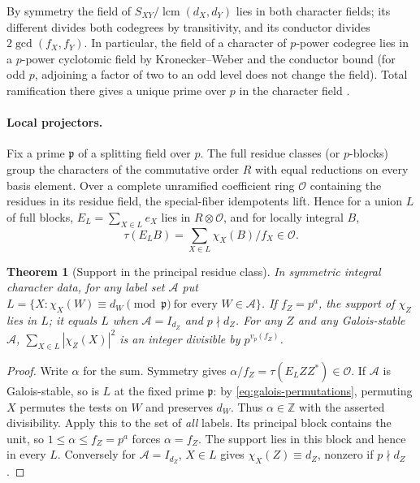 \documentclass[11pt,a4paper]{article}
\numberwithin{equation}{section}
\newtheorem{theorem}{Theorem}[section]
\theoremstyle{remark}
\newcommand{\ZZ}{\mathbb Z}
\newcommand{\lcm}{\operatorname{lcm}}
\begin{document}
By symmetry the field of $S_{XY}/\lcm(d_X,d_Y)$ lies in both character
fields; its different divides both codegrees by transitivity, and its
conductor divides $2\gcd(f_X,f_Y)$. In particular, the field of a character of $p$-power codegree lies
in a $p$-power cyclotomic field by Kronecker--Weber and the conductor bound
(for odd $p$, adjoining a factor of two to an odd level does not change the field).
Total ramification there gives a unique prime over $p$ in the character field
\cite[Lemma~3.1.13 and Theorem~7.5.5]{Sharifi}.

\paragraph{Local projectors.}
Fix a prime $\mathfrak p$ of a splitting field over $p$. The full residue classes (or $p$-blocks) group the characters of the commutative order $R$ with equal reductions on every basis element. Over a complete unramified coefficient ring $\mathcal O$ containing the residues in its residue field, the special-fiber idempotents lift. Hence for a union $L$ of full blocks, $E_L=\sum_{X\in L}e_X$ lies in $R\otimes\mathcal O$, and for locally integral $B$,
\begin{equation}\label{eq:local}
 \tau(E_LB)=\sum_{X\in L}\chi_X(B)/f_X\in\mathcal O .
\end{equation}

\begin{theorem}[Support in the principal residue class]\label{fam:M:2.7}\label{thm:principal-support}\label{lem:prime-power-support}
In symmetric integral character data, for any label set $\mathcal A$ put
$L=\{X:\chi_X(W)\equiv d_W\pmod{\mathfrak p}\ \text{for every } W\in\mathcal A\}$.
If $f_Z=p^a$, the support of $\chi_Z$ lies in $L$; it equals $L$ when $\mathcal A=I_{d_Z}$ and $p\nmid d_Z$. For any $Z$ and any Galois-stable $\mathcal A$, $\sum_{X\in L}|\chi_Z(X)|^2$ is an integer divisible by $p^{v_p(f_Z)}$.
\end{theorem}
\begin{proof}
Write $\alpha$ for the sum. Symmetry gives $\alpha/f_Z=\tau(E_LZZ^*)\in\mathcal O$. If $\mathcal A$ is Galois-stable, so is $L$ at the fixed prime $\mathfrak p$: by \eqref{eq:galois-permutations}, permuting $X$ permutes the tests on $W$ and preserves $d_W$. Thus $\alpha\in\ZZ$ with the asserted divisibility. Apply this to the set of \emph{all} labels. Its principal block contains the unit, so $1\le\alpha\le f_Z=p^a$ forces $\alpha=f_Z$. The support lies in this block and hence in every $L$. Conversely for $\mathcal A=I_{d_Z}$, $X\in L$ gives $\chi_X(Z)\equiv d_Z$, nonzero if $p\nmid d_Z$.
\end{proof}
\end{document}
